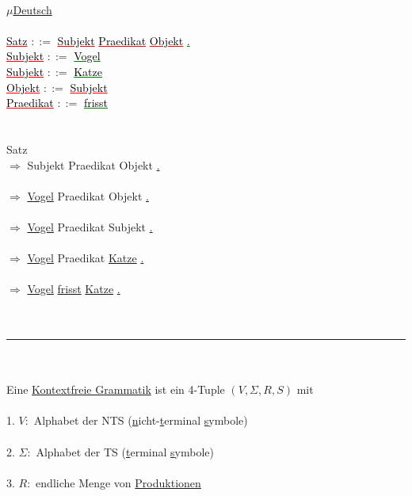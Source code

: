 \documentclass[18pt,a4paper]{scrreprt}
\begin{document}
\\
\uline{$\mu$Deutsch}\\
\\
\textcolor{red}{\uline{\textcolor{black}{Satz}}} $::=$ \textcolor{red}{\uline{\textcolor{black}{Subjekt}}} \textcolor{red}{\uline{\textcolor{black}{Praedikat}}} \textcolor{red}{\uline{\textcolor{black}{Objekt}}} \textcolor{green}{\uline{\textcolor{black}{.}}}\\
\textcolor{red}{\uline{\textcolor{black}{Subjekt}}} $::=$ \textcolor{green}{\uline{\textcolor{black}{Vogel}}}\\ 
\textcolor{red}{\uline{\textcolor{black}{Subjekt}}} $::=$ \textcolor{green}{\uline{\textcolor{black}{Katze}}}\\
\textcolor{red}{\uline{\textcolor{black}{Objekt}}} $::=$ \textcolor{red}{\uline{\textcolor{black}{Subjekt}}}\\
\textcolor{red}{\uline{\textcolor{black}{Praedikat}}} $::=$ \textcolor{green}{\uline{\textcolor{black}{frisst}}}\\
\\
\\
Satz\\
$\Rightarrow$ Subjekt Praedikat Objekt \uline{.}\\
\\
$\Rightarrow$ \uline{Vogel} Praedikat Objekt \uline{.}\\
\\
$\Rightarrow$ \uline{Vogel} Praedikat Subjekt \uline{.}\\
\\
$\Rightarrow$ \uline{Vogel} Praedikat \uline{Katze} \uline{.}\\
\\
$\Rightarrow$ \uline{Vogel} \uline{frisst} \uline{Katze} \uline{.}\\
\\
\\
\rule{\textwidth}{0.4mm}\\
\\
Eine \uline{Kontextfreie Grammatik} ist ein 4-Tuple $(V, \Sigma, R, S)$ mit\\
\\
1. $V:$ Alphabet der NTS (\uline{n}icht-\uline{t}erminal \uline{s}ymbole)\\
\\
2. $\Sigma:$ Alphabet der TS (\uline{t}erminal \uline{s}ymbole)\\
\\
3. $R:$ endliche Menge von \uline{Produktionen}\\
\end{document}
